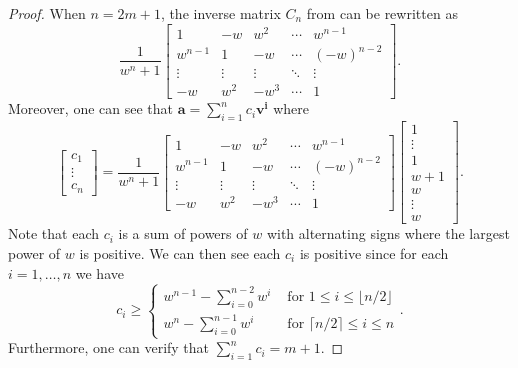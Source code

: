 \documentclass [12pt,a4paper,reqno]{amsart}
\theoremstyle{plain}
\theoremstyle{definition}
\newtheorem{Assumptions and Discussion}[Theorem]{Assumptions and Discussion}
\theoremstyle{remark}
\begin{document}
\begin{proof}
When $n=2m+1$, the inverse matrix $C_n$ from  can be rewritten as
\[
        \frac{1}{w^n+1}\begin{bmatrix}
             1 & -w & w^2 & \cdots & w^{n-1}\\
            w^{n-1} & 1 & -w & \cdots & (-w)^{n-2}\\
            \vdots & \vdots & \vdots & \ddots & \vdots\\
            -w & w^2 & -w^3 & \cdots & 1
        \end{bmatrix}.
    \]
    Moreover, one can see that $\mathbf{a}=\sum _{i=1}^n c_i\mathbf{v^i}$ where 
    \begin{equation}\label{oddCycle}
     \begin{bmatrix}
             c_1 \\
            \vdots\\
            c_n
        \end{bmatrix}=\frac{1}{w^n+1}\begin{bmatrix}
             1 & -w & w^2 & \cdots & w^{n-1}\\
            w^{n-1} & 1 & -w & \cdots & (-w)^{n-2}\\
            \vdots & \vdots & \vdots & \ddots & \vdots\\
            -w & w^2 & -w^3 & \cdots & 1
        \end{bmatrix}\begin{bmatrix}
             1 \\
             \vdots\\
            1\\
            w+1\\
            w\\
            \vdots\\
            w 
        \end{bmatrix}.
    \end{equation}
    Note that each $c_i$ is a sum of powers of $w$ with alternating signs where the largest power of $w$ is positive. We can then see each $c_i$ is positive since for each $i=1,\dots,n$ we have
        \[
            c_i\geq \begin{cases}
                w^{n-1}-\sum_{i=0}^{n-2}w^i & \text{ for }1\leq i\leq \lfloor n/2\rfloor\\
                w^n-\sum_{i=0}^{n-1}w^i & \text{ for }\lceil n/2\rceil\leq i\leq n
            \end{cases}.
        \]
    Furthermore, one can verify that $\sum_{i=1}^n c_i = m+1$.


\end{proof}
\end{document}
